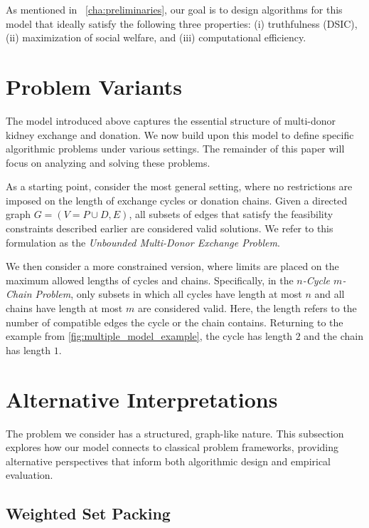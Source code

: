 As mentioned in ~\autoref{cha:preliminaries}, our goal is to design algorithms for this model that ideally satisfy the following three properties:  
(i) truthfulness (DSIC),  
(ii) maximization of social welfare, and  
(iii) computational efficiency.

\section{Problem Variants}

The model introduced above captures the essential structure of multi-donor kidney exchange and donation. We now build upon this model to define specific algorithmic problems under various settings. The remainder of this paper will focus on analyzing and solving these problems.

As a starting point, consider the most general setting, where no restrictions are imposed on the length of exchange cycles or donation chains. Given a directed graph $G = (V = P \cup D, E)$, all subsets of edges that satisfy the feasibility constraints described earlier are considered valid solutions. We refer to this formulation as the \textit{Unbounded Multi-Donor Exchange Problem}.

We then consider a more constrained version, where limits are placed on the maximum allowed lengths of cycles and chains. Specifically, in the \textit{$n$-Cycle $m$-Chain Problem}, only subsets in which all cycles have length at most $n$ and all chains have length at most $m$ are considered valid. Here, the length refers to the number of compatible edges the cycle or the chain contains. Returning to the example from \autoref{fig:multiple_model_example}, the cycle has length $2$ and the chain has length $1$.



\section{Alternative Interpretations}

The problem we consider has a structured, graph-like nature. This subsection explores how our model connects to classical problem frameworks, providing alternative perspectives that inform both algorithmic design and empirical evaluation.

\subsection{Weighted Set Packing}

